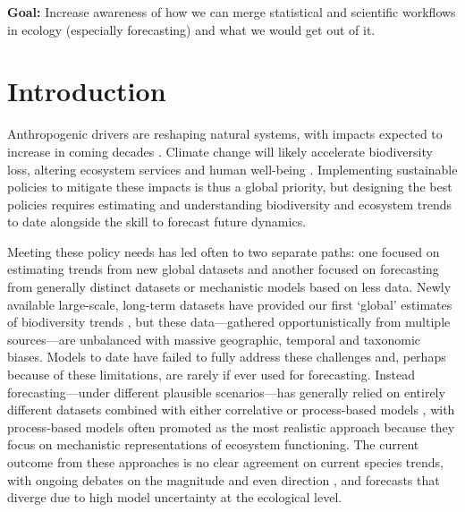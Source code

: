 \documentclass[11pt]{article}
\begin{document}
{\noindent \bf Goal:} Increase awareness of how we can merge statistical and scientific workflows in ecology (especially forecasting) and what we would get out of it.
\vspace*{0.5cm}

\section{Introduction}

Anthropogenic drivers are reshaping natural systems, with impacts expected to increase in coming decades \citep{Diaz2019}. Climate change will likely accelerate biodiversity loss, altering ecosystem services and human well-being \citep{IPBES2019}. Implementing sustainable policies to mitigate these impacts is thus a global priority, but designing the best policies requires estimating and understanding biodiversity and ecosystem trends to date alongside the skill to forecast future dynamics. %

Meeting these policy needs has led often to two separate paths: one focused on estimating trends from new global datasets and another focused on forecasting from generally distinct datasets or mechanistic models based on less data. Newly available large-scale, long-term datasets have provided our first `global' estimates of biodiversity trends \citep[e.g.][]{Dornelas2018}, but these data---gathered opportunistically from multiple sources---are unbalanced with massive geographic, temporal and taxonomic biases. Models to date have failed to fully address these challenges and, perhaps because of these limitations, are rarely if ever used for forecasting. 
Instead forecasting---under different plausible scenarios---has generally relied on entirely different datasets combined with either correlative  or process-based models \citep{IPBES2019}, with process-based models often promoted as the most realistic approach \citep{Urban2016, Pilowsky2022} because they focus on mechanistic representations of ecosystem functioning. The current outcome from these approaches is no clear agreement on current species trends, with ongoing debates on the magnitude and even direction \citep{Dornelas2014, Leung2020, Buschke2021, Johnson2024}, and forecasts that diverge due to high model uncertainty at the ecological level. 
\end{document}
